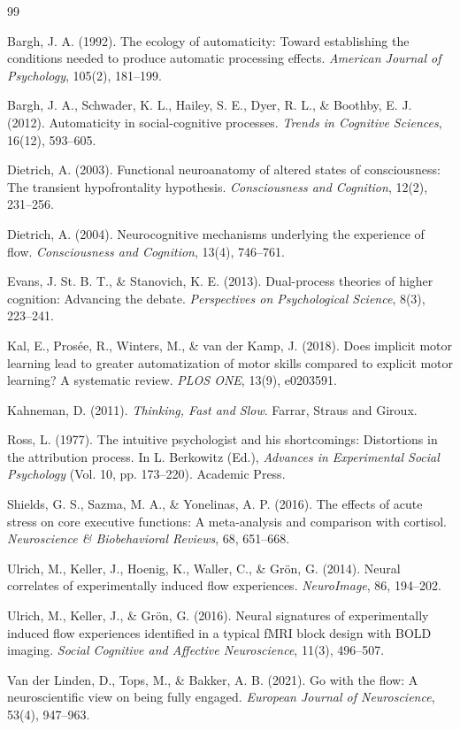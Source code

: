 \documentclass[12pt, a4paper]{article}
\theoremstyle{plain}
\theoremstyle{definition}
\theoremstyle{remark}
\begin{document}
\begin{thebibliography}{99}

 Bargh, J. A. (1992). The ecology of automaticity: Toward establishing the conditions needed to produce automatic processing effects. \textit{American Journal of Psychology}, 105(2), 181--199.

 Bargh, J. A., Schwader, K. L., Hailey, S. E., Dyer, R. L., \& Boothby, E. J. (2012). Automaticity in social-cognitive processes. \textit{Trends in Cognitive Sciences}, 16(12), 593--605.

 Dietrich, A. (2003). Functional neuroanatomy of altered states of consciousness: The transient hypofrontality hypothesis. \textit{Consciousness and Cognition}, 12(2), 231--256.

 Dietrich, A. (2004). Neurocognitive mechanisms underlying the experience of flow. \textit{Consciousness and Cognition}, 13(4), 746--761.

 Evans, J. St. B. T., \& Stanovich, K. E. (2013). Dual-process theories of higher cognition: Advancing the debate. \textit{Perspectives on Psychological Science}, 8(3), 223--241.

 Kal, E., Prosée, R., Winters, M., \& van der Kamp, J. (2018). Does implicit motor learning lead to greater automatization of motor skills compared to explicit motor learning? A systematic review. \textit{PLOS ONE}, 13(9), e0203591.

 Kahneman, D. (2011). \textit{Thinking, Fast and Slow}. Farrar, Straus and Giroux.

 Ross, L. (1977). The intuitive psychologist and his shortcomings: Distortions in the attribution process. In L. Berkowitz (Ed.), \textit{Advances in Experimental Social Psychology} (Vol. 10, pp. 173--220). Academic Press.

 Shields, G. S., Sazma, M. A., \& Yonelinas, A. P. (2016). The effects of acute stress on core executive functions: A meta-analysis and comparison with cortisol. \textit{Neuroscience \& Biobehavioral Reviews}, 68, 651--668.

 Ulrich, M., Keller, J., Hoenig, K., Waller, C., \& Grön, G. (2014). Neural correlates of experimentally induced flow experiences. \textit{NeuroImage}, 86, 194--202.

 Ulrich, M., Keller, J., \& Grön, G. (2016). Neural signatures of experimentally induced flow experiences identified in a typical fMRI block design with BOLD imaging. \textit{Social Cognitive and Affective Neuroscience}, 11(3), 496--507.

 Van der Linden, D., Tops, M., \& Bakker, A. B. (2021). Go with the flow: A neuroscientific view on being fully engaged. \textit{European Journal of Neuroscience}, 53(4), 947--963.

\end{thebibliography}
\end{document}
